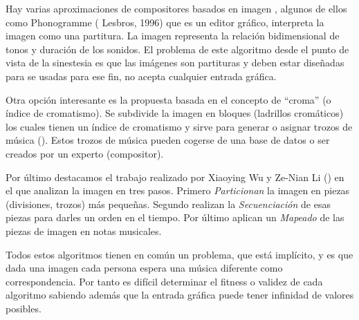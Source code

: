 Hay varias aproximaciones de compositores basados en imagen , algunos de ellos como Phonogramme (\cite{Phonogramme} Lesbros, 1996) que es un editor gráfico, interpreta la imagen como una partitura. La imagen representa la relación bidimensional de tonos y duración de los sonidos. El problema de este algoritmo desde el punto de vista de la sinestesia es que las imágenes son partituras y deben estar diseñadas para se usadas para ese fin, no acepta cualquier entrada gráfica. 

Otra opción interesante es la propuesta basada en el concepto de ``croma'' (o índice de cromatismo). Se subdivide la imagen en bloques (ladrillos cromáticos) los cuales tienen un índice de cromatismo y sirve para generar o asignar trozos de música (\cite{bricksConvertsMusic}). Estos trozos de música pueden cogerse de una base de datos o ser creados por un experto (compositor).

Por último destacamos el trabajo realizado por Xiaoying Wu y Ze-Nian Li (\cite{ImageBaseComposition}) en el que analizan la imagen en tres pasos. Primero \emph{Particionan} la imagen en piezas (divisiones, trozos) más pequeñas. Segundo realizan la \emph{Secuenciación} de esas piezas para darles un orden en el tiempo. Por último aplican un \emph{Mapeado} de las piezas de imagen en notas musicales.

Todos estos algoritmos tienen en común un problema, que está implícito, y es que dada una imagen cada persona espera una música diferente como correspondencia. Por tanto es difícil determinar el fitness o validez de cada algoritmo sabiendo además que la entrada gráfica puede tener infinidad de valores posibles.

